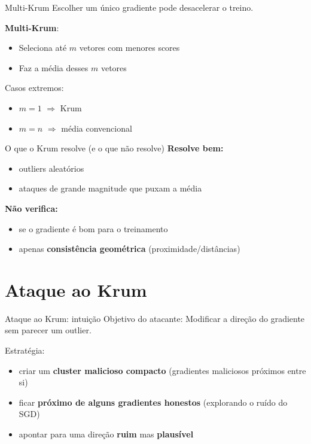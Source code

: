\documentclass[aspectratio=169]{beamer}
\begin{document}
\begin{frame}{Multi-Krum}
  Escolher um único gradiente pode desacelerar o treino.

  \vspace{0.6em}
  \textbf{Multi-Krum}:
  \begin{itemize}
    \item Seleciona até \(m\) vetores com menores scores
    \item Faz a média desses \(m\) vetores
  \end{itemize}

  \vspace{0.4em}
  Casos extremos:
  \begin{itemize}
    \item \(m=1\) \(\Rightarrow\) Krum
    \item \(m=n\) \(\Rightarrow\) média convencional
  \end{itemize}
\end{frame}

\begin{frame}{O que o Krum resolve (e o que não resolve)}
  \textbf{Resolve bem:}
  \begin{itemize}
    \item outliers aleatórios
    \item ataques de grande magnitude que puxam a média
  \end{itemize}

  \vspace{0.6em}
  \textbf{Não verifica:}
  \begin{itemize}
    \item se o gradiente é bom para o treinamento
    \item apenas \textbf{consistência geométrica} (proximidade/distâncias)
  \end{itemize}
\end{frame}

\section{Ataque ao Krum}

\begin{frame}{Ataque ao Krum: intuição}
  Objetivo do atacante: Modificar a direção do gradiente sem parecer um outlier.

  \vspace{0.6em}
  Estratégia:
  \begin{itemize}
    \item criar um \textbf{cluster malicioso compacto} (gradientes maliciosos próximos entre si)
    \item ficar \textbf{próximo de alguns gradientes honestos} (explorando o ruído do SGD)
    \item apontar para uma direção \textbf{ruim} mas \textbf{plausível}
  \end{itemize}
\end{frame}
\end{document}
